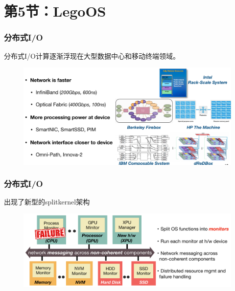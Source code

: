 \section{第5节：LegoOS} %
\begin{frame}[fragile]
    \frametitle{分布式I/O}
    分布式I/O计算逐渐浮现在大型数据中心和移动终端领域。
  
   
    
        \begin{figure}
        \includegraphics[width=0.9\linewidth]{figs/disio-current.png}
        \end{figure}
\end{frame}

\begin{frame}[fragile]
    \frametitle{分布式I/O}
    出现了新型的splitkernel架构
    
    
    
    \begin{figure}
        \includegraphics[width=0.9\linewidth]{figs/disio-splitkernel.png}
    \end{figure}
\end{frame}

